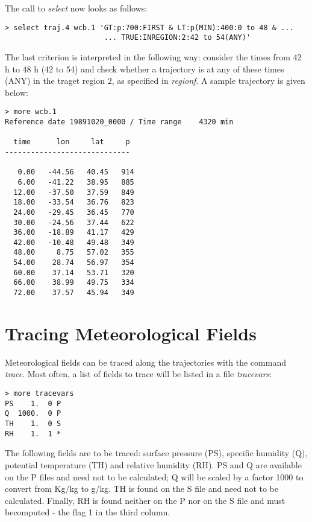 \documentclass[a4paper,10pt]{article}
\begin{document}
\noindent
The call to {\em select} now looks as follows:

\begin{verbatim}
> select traj.4 wcb.1 'GT:p:700:FIRST & LT:p(MIN):400:0 to 48 & ...
                       ... TRUE:INREGION:2:42 to 54(ANY)'
\end{verbatim}
 
\noindent
The last criterion is interpreted in the following way: consider the times from 42 h to 48 h (42 to 54) and check whether a trajectory is at any of these times (ANY) in the traget region 2, as specified in {\em regionf}. A sample trajectory is given below:

\begin{verbatim}
> more wcb.1
Reference date 19891020_0000 / Time range    4320 min

  time      lon     lat     p
-----------------------------

   0.00   -44.56   40.45   914
   6.00   -41.22   38.95   885
  12.00   -37.50   37.59   849
  18.00   -33.54   36.76   823
  24.00   -29.45   36.45   770
  30.00   -24.56   37.44   622
  36.00   -18.89   41.17   429
  42.00   -10.48   49.48   349
  48.00     8.75   57.02   355
  54.00    28.74   56.97   354
  60.00    37.14   53.71   320
  66.00    38.99   49.75   334
  72.00    37.57   45.94   349
\end{verbatim}

\section{Tracing Meteorological Fields}

Meteorological fields can be traced along the trajectories with the command {\em trace}. Most often, a list of fields to trace will be listed in a file {\em tracevars}:

\begin{verbatim}
> more tracevars 
PS    1.  0 P
Q  1000.  0 P
TH    1.  0 S
RH    1.  1 *
\end{verbatim}

\noindent
The following fields are to be traced: surface pressure (PS), specific humidity (Q), potential temperature (TH) and relative humidity (RH). PS and Q are available on the P files and need not to be calculated; Q will be scaled by a factor 1000 to convert from Kg/kg to g/kg. TH is found on the S file and need not to be calculated. Finally, RH is found neither on the P nor on the S file and must becomputed - the flag 1 in the third column.\\
\end{document}
